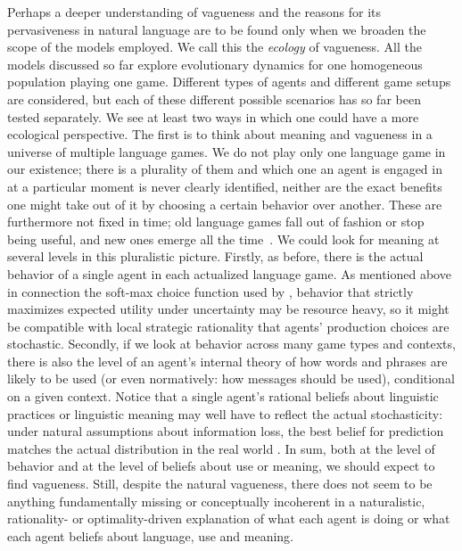 \documentclass[a4paper]{article}
\newcommand{\mf}[1]{\textcolor{Red}{[mf: #1]}}
\begin{document}
Perhaps a deeper understanding of vagueness and the reasons for its pervasiveness in natural language are to be found only when we broaden the scope of the models employed.
We call this the \emph{ecology} of vagueness.
All the models discussed so far explore evolutionary dynamics for one homogeneous population playing one game.
Different types of agents and different game setups are considered, but each of these different possible scenarios has so far been tested separately.
We see at least two ways in which one could have a more ecological perspective.
The first is to think about meaning and vagueness in a universe of multiple language games.
We do not play only one language game in our existence; there is a plurality of them and which one an agent is engaged in at a particular moment is never clearly identified, neither are the exact benefits one might take out of it by choosing a certain behavior over another.
These are furthermore not fixed in time; old language games fall out of fashion or stop being useful, and new ones emerge all the time~\parencite[\S 23]{wittgenstein_philosophical_1953}.
We could look for meaning at several levels in this pluralistic picture.
Firstly, as before, there is the actual behavior of a single agent in each actualized language game.
As mentioned above in connection the soft-max choice function used by \textcite{franke_vagueness_2011}, behavior that strictly maximizes expected utility under uncertainty may be resource heavy, so it might be compatible with local strategic rationality that agents' production choices are stochastic.
Secondly, if we look at behavior across many game types and contexts, there is also the level of an agent's internal theory of how words and phrases are likely to be used (or even normatively: how messages should be used), conditional on a given context.
Notice that a single agent's rational beliefs about linguistic practices or linguistic meaning may well have to reflect the actual stochasticity: under natural assumptions about information loss, the best belief for prediction matches the actual distribution in the real world \parencite[\emph{e.g.}][]{VehtariOjanen2012:A-survey-of-Bay}.
In sum, both at the level of behavior and at the level of beliefs about use or meaning, we should expect to find vagueness.
Still, despite the natural vagueness, there does not seem to be anything fundamentally missing or conceptually incoherent in a naturalistic, rationality- or optimality-driven explanation of what each agent is doing or what each agent beliefs about language, use and meaning.
\end{document}
